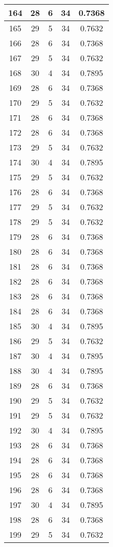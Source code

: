\documentclass[letterpaper, 12pt]{article}
\begin{document}
\begin{longtable}{|c|c|c|c|c|}
\hline
164 & 28 & 6 & 34 & 0.7368 \\
\hline
165 & 29 & 5 & 34 & 0.7632 \\
\hline
166 & 28 & 6 & 34 & 0.7368 \\
\hline
167 & 29 & 5 & 34 & 0.7632 \\
\hline
168 & 30 & 4 & 34 & 0.7895 \\
\hline
169 & 28 & 6 & 34 & 0.7368 \\
\hline
170 & 29 & 5 & 34 & 0.7632 \\
\hline
171 & 28 & 6 & 34 & 0.7368 \\
\hline
172 & 28 & 6 & 34 & 0.7368 \\
\hline
173 & 29 & 5 & 34 & 0.7632 \\
\hline
174 & 30 & 4 & 34 & 0.7895 \\
\hline
175 & 29 & 5 & 34 & 0.7632 \\
\hline
176 & 28 & 6 & 34 & 0.7368 \\
\hline
177 & 29 & 5 & 34 & 0.7632 \\
\hline
178 & 29 & 5 & 34 & 0.7632 \\
\hline
179 & 28 & 6 & 34 & 0.7368 \\
\hline
180 & 28 & 6 & 34 & 0.7368 \\
\hline
181 & 28 & 6 & 34 & 0.7368 \\
\hline
182 & 28 & 6 & 34 & 0.7368 \\
\hline
183 & 28 & 6 & 34 & 0.7368 \\
\hline
184 & 28 & 6 & 34 & 0.7368 \\
\hline
185 & 30 & 4 & 34 & 0.7895 \\
\hline
186 & 29 & 5 & 34 & 0.7632 \\
\hline
187 & 30 & 4 & 34 & 0.7895 \\
\hline
188 & 30 & 4 & 34 & 0.7895 \\
\hline
189 & 28 & 6 & 34 & 0.7368 \\
\hline
190 & 29 & 5 & 34 & 0.7632 \\
\hline
191 & 29 & 5 & 34 & 0.7632 \\
\hline
192 & 30 & 4 & 34 & 0.7895 \\
\hline
193 & 28 & 6 & 34 & 0.7368 \\
\hline
194 & 28 & 6 & 34 & 0.7368 \\
\hline
195 & 28 & 6 & 34 & 0.7368 \\
\hline
196 & 28 & 6 & 34 & 0.7368 \\
\hline
197 & 30 & 4 & 34 & 0.7895 \\
\hline
198 & 28 & 6 & 34 & 0.7368 \\
\hline
199 & 29 & 5 & 34 & 0.7632 \\
\hline
\end{longtable}
\end{document}
